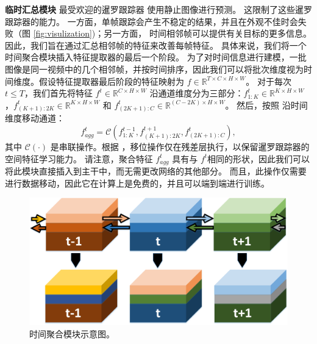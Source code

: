 \textbf{临时汇总模块}
最受欢迎的暹罗跟踪器 \cite{SiamRPN++, Wang2018SiamMask} 使用静止图像进行预测。%
这限制了这些暹罗跟踪器的能力。
一方面，单帧跟踪会产生不稳定的结果，并且在外观不佳时会失败（图 \ref{fig:visulization})；另一方面，
时间相邻帧可以提供有关目标的更多信息。
因此，我们旨在通过汇总相邻帧的特征来改善每帧特征。
具体来说，我们将一个时间聚合模块插入特征提取器的最后一个阶段。
为了对时间信息进行建模，一批图像是同一视频中的几个相邻帧，并按时间排序，因此我们可以将批次维度视为时间维度。假设特征提取器最后阶段的特征映射为 $f \in \mathbb R ^ {T \times C \times H \times W}$。
对于每次 $t \leq T$，我们首先将特征 $f^t \in \mathbb R ^ {C \times H \times W}$ 沿通道维度分为三部分：$f_{1:K}^t \in \mathbb R ^ {K \times H \times W}$，$f_{(K+1):2K}^t \in \mathbb R ^ {K \times H \times W}$ 和 $f_{(2K+1):C}^t \in \mathbb R ^ {(C-2K) \times H \times W}$。
然后，按照 \cite{lin2019tsm}沿时间维度移动通道：
\begin{equation}
    f_{agg}^t = \mathcal{C}(f_{{1:K}}^{t-1}, f_{(K+1):2K}^{t+1}, f_{(2K+1):C}^{t}),
\end{equation}
其中 $\mathcal{C}(\cdot)$ 是串联操作。根据 \cite{lin2019tsm}，移位操作仅在残差层执行，以保留暹罗跟踪器的空间特征学习能力。
请注意，聚合特征 $f_{agg}^t$ 具有与 $f^t$相同的形状，因此我们可以将此模块直接插入到主干中，而无需更改网络的其他部分。
而且，此操作仅需要进行数据移动，因此它在计算上是免费的，并且可以端到端进行训练。

\begin{figure}[t]
    \centering
    \includegraphics[width=1.0\textwidth]{Img/end/TSM_v1.pdf}
    \caption{时间聚合模块示意图。}
    \label{fig:TSM}
\end{figure}

